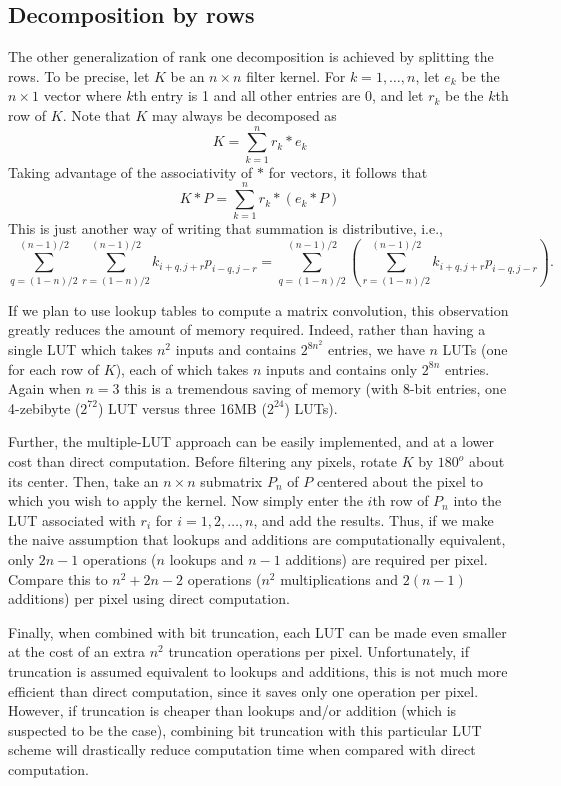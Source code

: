 \documentclass[12pt]{amsart}
\theoremstyle{definition}
\theoremstyle{remark}
\numberwithin{thm}{section}
\begin{document}
\subsection{Decomposition by rows}
The other generalization of rank one decomposition is achieved by splitting the rows. To be precise, let $K$ be an $n\times n$ filter kernel. For $k=1,\ldots,n$, let $e_k$ be the $n\times 1$ vector where $k$th entry is 1 and all other entries are 0, and let $r_k$ be the $k$th row of $K$. Note that $K$ may always be decomposed as 
$$K = \sum_{k=1}^nr_k * e_k$$
Taking advantage of the associativity of $*$ for vectors, it follows that 
$$K * P= \sum_{k=1}^nr_k * \left(e_k * P\right)$$
This is just another way of writing that summation is distributive, i.e.,
\[\sum_{q = (1-n)/2}^{(n-1)/2}\sum_{r = (1-n)/2}^{(n-1)/2}k_{i+q,j+r}p_{i-q,j-r} = \sum_{q = (1-n)/2}^{(n-1)/2}\left(\sum_{r = (1-n)/2}^{(n-1)/2}k_{i+q,j+r}p_{i-q,j-r}\right).\]

If we plan to use lookup tables to compute a matrix convolution, this observation greatly reduces the amount of memory required. Indeed, rather than having a single LUT which takes $n^2$ inputs and contains $2^{8n^2}$ entries, we have $n$ LUTs (one for each row of $K$), each of which takes $n$ inputs and contains only $2^{8n}$ entries. Again when $n=3$ this is a tremendous saving of memory (with 8-bit entries, one 4-zebibyte ($2^{72}$) LUT versus three 16MB ($2^{24}$) LUTs).

Further, the multiple-LUT approach can be easily implemented, and at a lower cost than direct computation. Before filtering any pixels, rotate $K$ by $180^o$ about its center. Then, take an $n\times n$ submatrix $P_n$ of $P$ centered about the pixel to which you wish to apply the kernel. Now simply enter the $i$th row of $P_n$ into the LUT associated with $r_i$ for $i = 1,2,\ldots,n$, and add the results. Thus, if we make the naive assumption that lookups and additions are computationally equivalent, only $2n-1$ operations ($n$ lookups and $n-1$ additions) are required per pixel. Compare this to $n^2+2n-2$ operations ($n^2$ multiplications and $2(n-1)$ additions) per pixel using direct computation.

Finally, when combined with bit truncation, each LUT can be made even smaller at the cost of an extra $n^2$ truncation operations per pixel. Unfortunately, if truncation is assumed equivalent to lookups and additions, this is not much more efficient than direct computation, since it saves only one operation per pixel. However, if truncation is cheaper than lookups and/or addition (which is suspected to be the case), combining bit truncation with this particular LUT scheme will drastically reduce computation time when compared with direct computation.
\end{document}
